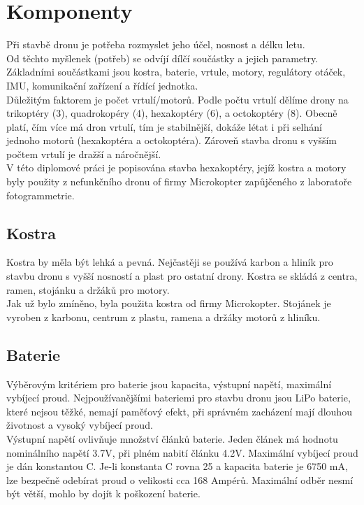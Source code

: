 \chapter{Komponenty}
\label{3-soucastky}

Při stavbě dronu je potřeba rozmyslet jeho účel, nosnost a délku letu. \cite{droncal}\\ Od těchto myšlenek (potřeb) se odvíjí dílčí součástky a jejich parametry. Základními součástkami jsou kostra, baterie, vrtule, motory, regulátory otáček, IMU, komunikační zařízení a řídící jednotka.\\
Důležitým faktorem je počet vrtulí/motorů. Podle počtu vrtulí dělíme drony na trikoptéry (3), quadrokopéry (4), hexakoptéry (6), a octokoptéry (8). Obecně platí, čím více má dron vrtulí, tím je stabilnější, dokáže létat i při selhání jednoho motorů (hexakoptéra a octokoptéra). Zároveň stavba dronu s vyšším počtem vrtulí je dražší a náročnější.\\
V této diplomové práci je popisována stavba hexakoptéry, jejíž kostra a motory byly použity z nefunkčního dronu of firmy Microkopter zapůjčeného z laboratoře fotogrammetrie.\\

\section{Kostra} 
Kostra by měla být lehká a pevná. Nejčastěji se používá karbon a hliník pro stavbu dronu s vyšší nosností a plast pro ostatní drony. Kostra se skládá z centra, ramen, stojánku a držáků pro motory.\\
Jak už bylo zmíněno, byla použita kostra od firmy Microkopter. Stojánek je vyroben z karbonu, centrum z plastu, ramena a držáky motorů z hliníku.\\


\section{Baterie} 
Výběrovým kritériem pro baterie jsou kapacita, výstupní napětí, maximální vybíjecí proud.
Nejpoužívanějšími bateriemi pro stavbu dronu jsou LiPo baterie, které nejsou těžké, nemají paměťový efekt, při správném zacházení mají dlouhou životnost a vysoký vybíjecí proud.\\
Výstupní napětí ovlivňuje množství článků baterie. Jeden článek má hodnotu nomi\-nálního napětí 3.7V, při plném nabití článku 4.2V. Maximální vybíjecí proud je dán konstantou C. Je-li konstanta C rovna 25 a kapacita baterie je 6750 mA, lze bezpečně odebírat proud o velikosti cca 168 Ampérů. Maximální odběr nesmí být větší, mohlo by dojít k poškození baterie.\\

